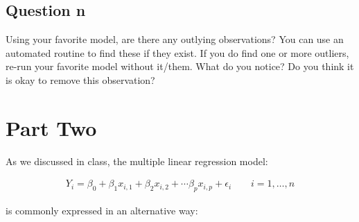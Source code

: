 \documentclass[10pt]{article}\usepackage[]{graphicx}\usepackage[]{xcolor}
\begin{document}
\subsection*{Question n}
    Using your favorite model, are there any outlying observations? You can use an automated routine to find these if
    they exist. If you do find one or more outliers, re-run your favorite model without it/them. What do you notice? Do
    you think it is okay to remove this observation?\newline

\section*{Part Two}

As we discussed in class, the multiple linear regression model:

\begin{equation*}
    \begin{aligned}
        Y_i = \beta_0 + \beta_1 x_{i,1} + \beta_2 x_{i,2} + \cdots \beta_p x_{i,p} + \epsilon_i \qquad i = 1, \ldots, n
    \end{aligned}
\end{equation*}

is commonly expressed in an alternative way:
\end{document}
